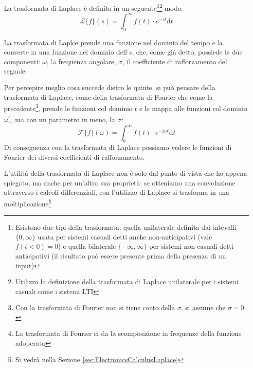 \documentclass[a4paper, 10pt, final]{article} %
\begin{document}
    \begin{samepage}
        \noindent La trasformata di Laplace \`{e} definita in un seguente\footnote{Esistono due tipi della trasformata: quella unilaterale definita dai intevalli $\{0,\infty\}$ usata per sistemi casuali detti anche non-anticipativi (vale $f(t<0)=0$) e quella bilaterale $\{-\infty,\infty\}$ per sistemi non-casuali detti anticipativi (il risultato pu\`{o} essere presente prima della presenza di un input)}\:\footnote{Utilizzo la definizione della trasformata di Laplace unilaterale per i sistemi casuali come i sistemi LTI} modo: \nopagebreak
        \[
            \mathcal{L}\{f\}(s) = \int_{0}^{\infty} f(t) \cdot e^{-st} \mathrm{d}t
        \]
    \end{samepage}%
    \noindent La trasformata di Laplce prende una funzione nel dominio del tempo e la converte in una funzione nel dominio dell'$s$, che, come gi\`{a} detto, possiede le due componenti: $\omega$, la frequenza angolare, $\sigma$, il coefficiente di rafforzamento del segnale.
    \begin{samepage}
        Per percepire meglio cosa succede dietro le quinte, si pu\`{o} pensare della trasformata di Laplace, come della trasformata di Fourier che come la precedente\footnote{Con la trasformata di Fourier non si tiene conto della $\sigma$, si assume che $\sigma = 0$}, prende le funzioni col dominio $t$ e le mappa alle funzioni col dominio $\omega$\footnote{La trasformata di Fourier ci da la scomposizione in frequenze della funzione adoperata}, ma con un parametro in meno, la $\sigma$:
        \[
            \mathcal{F}\{f\}(\omega) = \int_{0}^{\infty} f(t) \cdot e^{-j\omega t} \mathrm{d}t
        \]
        \noindent Di conseguenza con la trasformata di Laplace possiamo vedere le funzioni di Fourier dei diversi coefficienti di rafforzamento.
    \end{samepage}%
    
    L'utilit\`{a} della trasformata di Laplace non \`{e} solo dal punto di vista che ho appena spiegato, ma anche per un'altra sua propriet\`{a}: se otteniamo una convoluzione attraverso i calcoli differenziali, con l'utilizzo di Laplace si trasforma in una moltiplicazione\footnote{Si vedr\`{a} nella Sezione \ref{sec:ElectronicsCalculusLaplace}}
\end{document}
